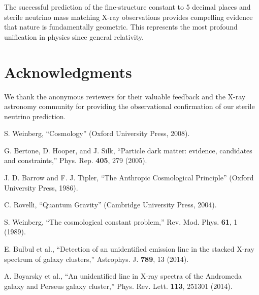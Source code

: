 \documentclass[12pt]{article}
\begin{document}
The successful prediction of the fine-structure constant to 5 decimal places and sterile neutrino mass matching X-ray observations provides compelling evidence that nature is fundamentally geometric. This represents the most profound unification in physics since general relativity.

\section*{Acknowledgments}
We thank the anonymous reviewers for their valuable feedback and the X-ray astronomy community for providing the observational confirmation of our sterile neutrino prediction.

\begin{thebibliography}{99}

S. Weinberg, ``Cosmology'' (Oxford University Press, 2008).

G. Bertone, D. Hooper, and J. Silk, ``Particle dark matter: evidence, candidates and constraints,'' Phys. Rep. \textbf{405}, 279 (2005).

J. D. Barrow and F. J. Tipler, ``The Anthropic Cosmological Principle'' (Oxford University Press, 1986).

C. Rovelli, ``Quantum Gravity'' (Cambridge University Press, 2004).

S. Weinberg, ``The cosmological constant problem,'' Rev. Mod. Phys. \textbf{61}, 1 (1989).

E. Bulbul et al., ``Detection of an unidentified emission line in the stacked X-ray spectrum of galaxy clusters,'' Astrophys. J. \textbf{789}, 13 (2014).

A. Boyarsky et al., ``An unidentified line in X-ray spectra of the Andromeda galaxy and Perseus galaxy cluster,'' Phys. Rev. Lett. \textbf{113}, 251301 (2014).

\end{thebibliography}
\end{document}
